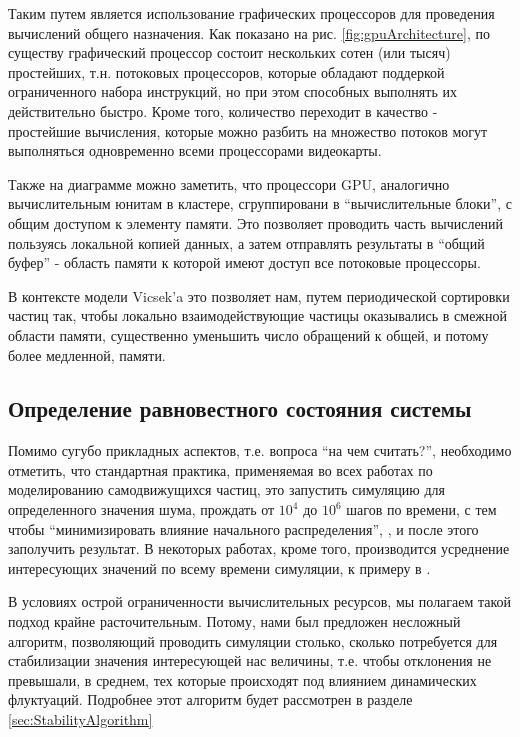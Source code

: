         Таким путем является использование графических процессоров для проведения вычислений общего назначения. Как показано на рис. \ref{fig:gpuArchitecture}, по существу графический процессор состоит нескольких сотен (или тысяч) простейших, т.н. потоковых процессоров, которые обладают поддеркой ограниченного набора инструкций, но при этом способных выполнять их действительно быстро. Кроме того, количество переходит в качество - простейшие вычисления, которые можно разбить на множество потоков могут выполняться одновременно всеми процессорами видеокарты.

        Также на диаграмме можно заметить, что процессори GPU, аналогично вычислительным юнитам в кластере, сгруппировани в ``вычислительные блоки'', с общим доступом к элементу памяти. Это позволяет проводить часть вычислений пользуясь локальной копией данных, а затем отправлять результаты в ``общий буфер'' - область памяти к которой имеют доступ все потоковые процессоры.

        В контексте модели Vicsek'a это позволяет нам, путем периодической сортировки частиц так, чтобы локально взаимодействующие частицы оказывались в смежной области памяти, существенно уменьшить число обращений к общей, и потому более медленной, памяти.

    \subsection{Определение равновестного состояния системы} %
    \label{sub:EquilibriumState}
        Помимо сугубо прикладных аспектов, т.е. вопроса ``на чем считать?'', необходимо отметить, что стандартная практика, применяемая во всех работах по моделированию самодвижущихся частиц, это запустить симуляцию для определенного значения шума, прождать от $10^{4}$ до $10^{6}$ шагов по времени, с тем чтобы ``минимизировать влияние начального распределения'', \cite{huepe2008}, и после этого заполучить результат. В некоторых работах, кроме того, производится усреднение интересующих значений по всему времени симуляции, к примеру в \cite{gregoire2004}.

        В условиях острой ограниченности вычислительных ресурсов, мы полагаем такой подход крайне расточительным. Потому, нами был предложен несложный алгоритм, позволяющий проводить симуляции столько, сколько потребуется для стабилизации значения интересующей нас величины, т.е. чтобы отклонения не превышали, в среднем, тех которые происходят под влиянием динамических флуктуаций. Подробнее этот алгоритм будет рассмотрен в разделе \ref{sec:StabilityAlgorithm}

